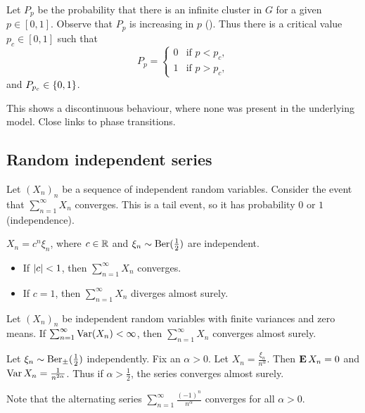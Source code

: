 Let $P_p$ be the probability that there is an infinite cluster in $G$
for a given $p \in [0, 1]$.
Observe that $P_p$ is increasing in $p$ (\TODO[coupling]).
Thus there is a critical value $p_c \in [0, 1]$ such that \[
    P_p = \begin{cases}
        0 & \text{if } p < p_c, \\
        1 & \text{if } p > p_c,
    \end{cases}
\] and $P_{p_c} \in \{0, 1\}$.
\begin{center}
\end{center}
This shows a discontinuous behaviour, where none was present in the
underlying model.
Close links to phase transitions.

\subsection{Random independent series} \label{sec:ris}
Let $(X_n)_n$ be a sequence of independent random variables.
Consider the event that $\sum_{n=1}^\infty X_n$ converges.
This is a tail event, so it has probability $0$ or $1$ (independence).
\begin{examples}
    \item $X_n = c^n \xi_n$, where $c \in \mathbb{R}$ and $\xi_n \sim \operatorname{Ber}(\frac12)$
    are independent.
    \begin{itemize}
        \item If $\lvert c\rvert < 1$, then $\sum_{n=1}^\infty X_n$ converges.
        \item If $c = 1$, then $\sum_{n=1}^\infty X_n$ diverges almost
        surely.
    \end{itemize}
\end{examples}

\begin{theorem}[Khinchine] \label{thm:ris:khinchine}
    Let $(X_n)_n$ be independent random variables with finite variances
    and zero means.
    If $\sum_{n=1}^\infty \operatorname{Var}(X_n) < \infty$, then $\sum_{n=1}^\infty X_n$
    converges almost surely.
\end{theorem}
\begin{examples}
    \item Let $\xi_n \sim \operatorname{Ber}_{\pm}(\frac12)$ independently.
    Fix an $\alpha > 0$.
    Let $X_n = \frac{\xi_n}{n^\alpha}$.
    Then $\operatorname{\mathbf E} X_n = 0$ and $\operatorname{Var} X_n = \frac{1}{n^{2\alpha}}$.
    Thus if $\alpha > \frac12$, the series converges almost surely.

    Note that the alternating series
    $\sum_{n=1}^\infty \frac{(-1)^n}{n^\alpha}$ converges for all
    $\alpha > 0$.
\end{examples}

